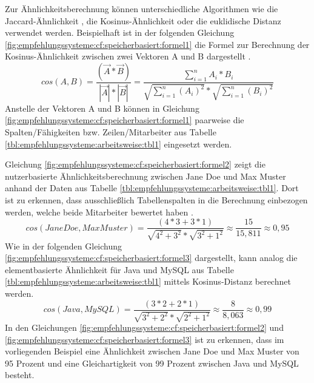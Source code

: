 Zur Ähnlichkeitsberechnung können unterschiedliche Algorithmen wie die Jaccard-Ähnlichkeit \cite[S. 2]{bharti:2019}, die Kosinus-Ähnlichkeit \cite[S. 2]{duong:2018} oder die euklidische Distanz \cite[S. 3]{cheng:2013} verwendet werden. Beispielhaft ist in der folgenden Gleichung \ref{fig:empfehlungssysteme:cf:speicherbasiert:formel1} die Formel zur Berechnung der Kosinus-Ähnlichkeit zwischen zwei Vektoren A und B dargestellt \cite[S. 111]{bharti:2019}.
\begin{equation}
cos(A,B) = \frac{(\vec{A} * \vec{B})}{|\vec{A}| * |\vec{B}|} = \frac{\sum_{i=1}^n A_i * B_i}{\sqrt{\sum_{i=1}^n (A_i)^2} * \sqrt{\sum_{i=1}^n (B_i)^2}}
\label{fig:empfehlungssysteme:cf:speicherbasiert:formel1}
\end{equation}
Anstelle der Vektoren A und B können in Gleichung \ref{fig:empfehlungssysteme:cf:speicherbasiert:formel1} paarweise die Spalten/Fähigkeiten bzw. Zeilen/Mitarbeiter aus Tabelle \ref{tbl:empfehlungssysteme:arbeitsweise:tbl1} eingesetzt werden.

Gleichung \ref{fig:empfehlungssysteme:cf:speicherbasiert:formel2} zeigt die nutzerbasierte Ähnlichkeitsberechnung zwischen Jane Doe und Max Muster anhand der Daten aus Tabelle \ref{tbl:empfehlungssysteme:arbeitsweise:tbl1}. Dort ist zu erkennen, dass ausschließlich Tabellenspalten in die Berechnung einbezogen werden, welche beide Mitarbeiter bewertet haben \cite[S. 2f.]{hao:2013}.
\begin{equation}
	cos(Jane Doe,Max Muster) = \frac{(4*3 + 3*1)}{\sqrt{4^2 + 3^2} * \sqrt{3^2 + 1^2}} \approx \frac{15}{15,811} \approx 0,95
	\label{fig:empfehlungssysteme:cf:speicherbasiert:formel2}
\end{equation}
Wie in der folgenden Gleichung \ref{fig:empfehlungssysteme:cf:speicherbasiert:formel3} dargestellt, kann analog die elementbasierte Ähnlichkeit für Java und MySQL aus Tabelle \ref{tbl:empfehlungssysteme:arbeitsweise:tbl1} mittels Kosinus-Distanz berechnet werden.
\begin{equation}
	cos(Java, MySQL) = \frac{(3*2 + 2*1)}{\sqrt{3^2 + 2^2} * \sqrt{2^2 + 1^2}} \approx \frac{8}{8,063} \approx 0,99
	\label{fig:empfehlungssysteme:cf:speicherbasiert:formel3}
\end{equation}
In den Gleichungen \ref{fig:empfehlungssysteme:cf:speicherbasiert:formel2} und \ref{fig:empfehlungssysteme:cf:speicherbasiert:formel3} ist zu erkennen, dass im vorliegenden Beispiel eine Ähnlichkeit zwischen Jane Doe und Max Muster von 95 Prozent und eine Gleichartigkeit von 99 Prozent zwischen Java und MySQL besteht.%

